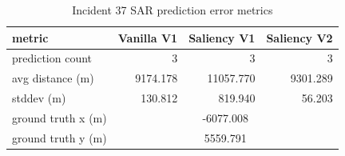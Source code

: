 \begin{table}[ht]
\centering
\caption{Incident 37 SAR prediction error metrics}
\label{tab:sar-incident-37}
\begin{tabular}{lrrr}
\hline
metric & Vanilla V1 & Saliency V1 & Saliency V2 \\
\hline
prediction count & 3 & 3 & 3 \\
avg distance (m) & 9174.178 & 11057.770 & 9301.289 \\
stddev (m) & 130.812 & 819.940 & 56.203 \\
ground truth x (m) & \multicolumn{3}{c}{-6077.008} \\
ground truth y (m) & \multicolumn{3}{c}{5559.791} \\
\hline
\end{tabular}
\end{table}
